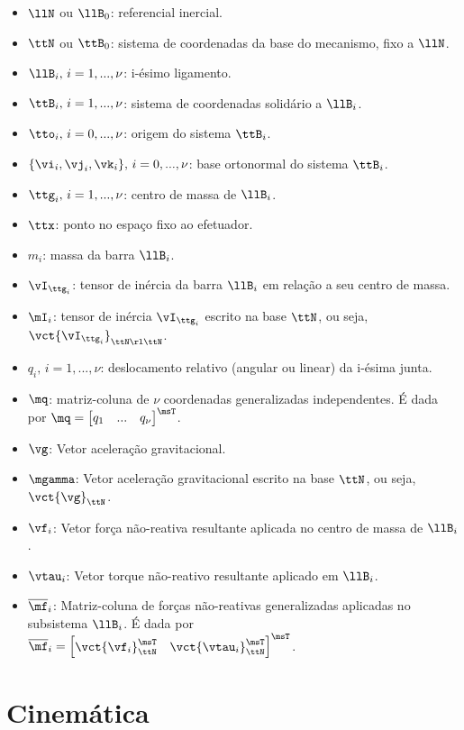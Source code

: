 \documentclass[]{politex}
\begin{document}
\begin{itemize}
\item $\llN$ ou $\llB_0$: referencial inercial.
\item $\ttN$ ou $\ttB_0$: sistema de coordenadas da base do mecanismo, fixo a $\llN$.
\item $\llB_i, \,i=1,...,\nu$: i-ésimo ligamento.
\item $\ttB_i, \,i=1,...,\nu$: sistema de coordenadas solid\'ario a $\llB_i$.
\item $\tto_i, \,i=0,...,\nu$: origem do sistema $\ttB_i$.
\item $\{\vi_i, \vj_i, \vk_i\}, \,i=0,...,\nu$: base ortonormal do sistema $\ttB_i$.
\item $\ttg_i, \,i=1,...,\nu$: centro de massa de $\llB_i$.
\item $\ttx$: ponto no espa\c{c}o fixo ao efetuador.
\item $m_i$: massa da barra $\llB_i$.
\item $\vI_{\ttg_i}$: tensor de in\'ercia da barra $\llB_i$ em relação a seu centro de massa.
\item $\mI_i$: tensor de in\'ercia $\vI_{\ttg_i}$ escrito na base $\ttN$, ou seja, $\vct{\vI_{\ttg_i}}_{\ttN \rl \ttN}$.
\item $q_i, \,i=1,...,\nu$: deslocamento relativo (angular ou linear) da i-ésima junta.
\item  $\mq$: matriz-coluna de $\nu$ coordenadas generalizadas independentes. É dada por $\mq = \begin{bmatrix}
q_1 & ... & {q}_{\nu}
\end{bmatrix}^\msT $.
\item $\vg$: Vetor aceleração gravitacional.
\item $\mgamma$: Vetor aceleração gravitacional escrito na base $\ttN$, ou seja, $\vct{\vg}_{\ttN}$.
\item $\vf_i$: Vetor força não-reativa resultante aplicada no centro de massa de $\llB_i$.
\item $\vtau_i$: Vetor torque não-reativo resultante aplicado em $\llB_i$.
\item $\overline{\mf}_i$: Matriz-coluna de forças não-reativas generalizadas aplicadas no subsistema $\llB_i$. É dada por $\overline{\mf}_i = \begin{bmatrix}
\vct{\vf_i}_\ttN^\msT &
\vct{\vtau_i}_\ttN^\msT
\end{bmatrix}^\msT $.
\end{itemize}

\section{Cinemática}
\end{document}
